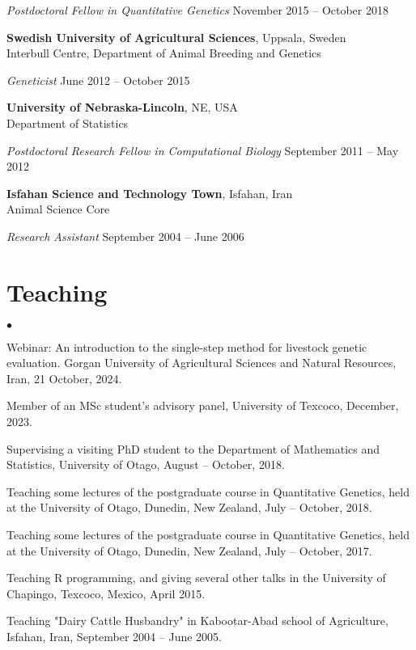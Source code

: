 \documentclass[margin,line]{res}
\newenvironment{list2}{
  \begin{list}{$\bullet$}{%
    \setlength{\itemsep}{0in}
    \setlength{\parsep}{0in} \setlength{\parskip}{0in}
    \setlength{\topsep}{0in} \setlength{\partopsep}{0in}
    \setlength{\leftmargin}{0.2in}}}
  {\end{list}}
\begin{document}
\begin{resume}
  {\em Postdoctoral Fellow in Quantitative Genetics} \hfill{November 2015 -- October 2018}

  {\bf Swedish University of Agricultural Sciences}, Uppsala, Sweden \\
  Interbull Centre, Department of Animal Breeding and Genetics
  
  {\em Geneticist} \hfill{June 2012 -- October 2015}

  {\bf University of Nebraska-Lincoln}, NE, USA \\
  Department of Statistics
  
  {\em Postdoctoral Research Fellow in Computational Biology} \hfill{September 2011 -- May 2012}

  {\bf Isfahan Science and Technology Town}, Isfahan, Iran \\
  Animal Science Core
  
  {\em Research Assistant} \hfill{September 2004 -- June 2006}
  \section{\sc Teaching}

  \begin{list2}
    \item Webinar: An introduction to the single-step method for livestock genetic evaluation. Gorgan University of Agricultural Sciences and Natural Resources, Iran, 21 October, 2024.
    \item Member of an MSc student's advisory panel, University of Texcoco, December, 2023.
    \item Supervising a visiting PhD student to the Department of Mathematics and Statistics, University of Otago, August -- October, 2018.
    \item Teaching some lectures of the postgraduate course in Quantitative Genetics, held at the University of Otago, Dunedin, New Zealand, July -- October, 2018.
    \item Teaching some lectures of the postgraduate course in Quantitative Genetics, held at the University of Otago, Dunedin, New Zealand, July -- October, 2017.
    \item Teaching R programming, and giving several other talks in the University of Chapingo, Texcoco, Mexico, April 2015.
    \item Teaching "Dairy Cattle Husbandry" in Kabootar-Abad school of Agriculture, Isfahan, Iran, September 2004 -- June 2005.
  \end{list2}

\end{resume}
\end{document}
